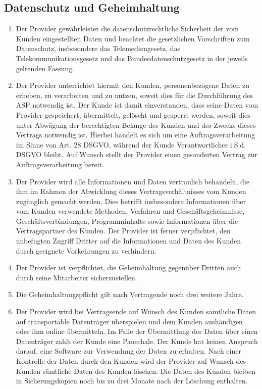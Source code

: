 \documentclass{terms}
\begin{document}
\subsection{Datenschutz und Geheimhaltung}
\begin{enumerate}
\item Der Provider gewährleistet die datenschutzrechtliche Sicherheit der vom Kunden eingestellten Daten und beachtet die gesetzlichen Vorschriften zum Datenschutz, insbesondere das Telemediengesetz, das Telekommunikationsgesetz und das Bundesdatenschutzgesetz in der jeweils geltenden Fassung.
\item Der Provider unterrichtet hiermit den Kunden, personenbezogene Daten zu erheben, zu verarbeiten und zu nutzen, soweit dies für die Durchführung des ASP notwendig ist.
      Der Kunde ist damit einverstanden, dass seine Daten vom Provider gespeichert, übermittelt, gelöscht und gesperrt werden, soweit dies unter Abwägung der berechtigten Belange des Kunden und des Zwecks dieses Vertrags notwendig ist.
      Hierbei handelt es sich um eine Auftragsverarbeitung im Sinne von Art. 28 DSGVO, während der Kunde Verantwortlicher i.S.d. DSGVO bleibt.
      Auf Wunsch stellt der Provider einen gesonderten Vertrag zur Auftragsverarbeitung bereit.
\item Der Provider wird alle Informationen und Daten vertraulich behandeln, die ihm im Rahmen der Abwicklung dieses Vertragsverhältnisses vom Kunden zugänglich gemacht werden.
      Dies betrifft insbesondere Informationen über vom Kunden verwendete Methoden, Verfahren und Geschäftsgeheimnisse, Geschäftsverbindungen, Programminhalte sowie Informationen über die Vertragspartner des Kunden.
      Der Provider ist ferner verpflichtet, den unbefugten Zugriff Dritter auf die Informationen und Daten des Kunden durch geeignete Vorkehrungen zu verhindern.
\item Der Provider ist verpflichtet, die Geheimhaltung gegenüber Dritten auch durch seine Mitarbeiter sicherzustellen.
\item Die Geheimhaltungspflicht gilt nach Vertragende noch drei weitere Jahre.
\item Der Provider wird bei Vertragsende auf Wunsch des Kunden sämtliche Daten auf transportable Datenträger überspielen und dem Kunden aushändigen oder ihm online übermitteln.
      Im Falle der Übermittlung der Daten über einen Datenträger zahlt der Kunde eine Pauschale.
      Der Kunde hat keinen Anspruch darauf, eine Software zur Verwendung der Daten zu erhalten.
      Nach einer Kontrolle der Daten durch den Kunden wird der Provider auf Wunsch des Kunden sämtliche Daten des Kunden löschen.
      Die Daten des Kunden bleiben in Sicherungskopien noch bis zu drei Monate nach der Löschung enthalten.
\end{enumerate}
\end{document}
